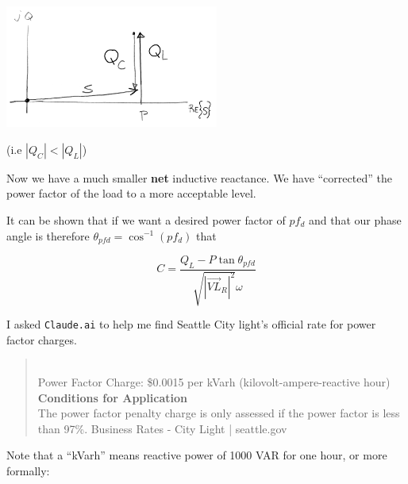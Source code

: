 \includegraphics[width=70mm]{figsChapt03/MF77903.png}

(i.e $|Q_C| < |Q_L|$)

Now we have a much smaller {\bf net} inductive reactance.   We have ``corrected''
the power factor of the load to a more acceptable level.

It can be shown that  if we want a desired power factor of $pf_d$ and that our phase
angle is therefore $\theta_{pfd} = \cos^{-1}(pf_d)$ that

\[
C = \frac{Q_L - P \tan \theta_{pfd}}{\sqrt{|\vec{VL}_R|^2} \omega}
\]
%
%
%
%
%
%
%
%
%
%
%
%
%
%
%

%


I asked {\tt Claude.ai} to help me find Seattle City light's official
rate for power factor charges.
\begin{quotation}
\\
Power Factor Charge: \$0.0015 per kVarh (kilovolt-ampere-reactive hour)\\
{\bf Conditions for Application}\\
The power factor penalty charge is only assessed if the power factor
is less than 97\%. Business Rates - City Light | seattle.gov
\end{quotation}
Note that a ``kVarh'' means reactive power of 1000 VAR for one hour,
or more formally:

